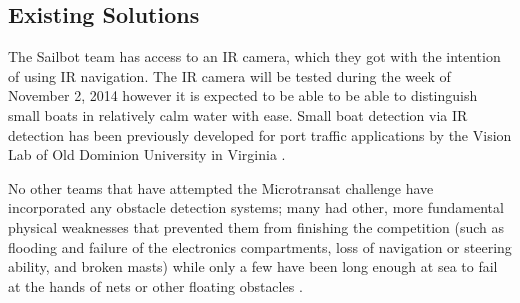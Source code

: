 \subsection{\label{sec:intro:existing-solutions}Existing Solutions}
The Sailbot team has access to an IR camera, which they got with the intention of using IR navigation. The IR camera will be tested during the week of November 2, 2014 however it is expected to be able to be able to distinguish small boats in relatively calm water with ease. Small boat detection via IR detection has been previously developed for port traffic applications by the Vision Lab of Old Dominion University in Virginia \cite{ODU-boat-IR-detection}.

No other teams that have attempted the Microtransat challenge have incorporated any obstacle detection systems; many had other, more fundamental physical weaknesses that prevented them from finishing the competition (such as flooding and failure of the electronics compartments, loss of navigation or steering ability, and broken masts) while only a few have been long enough at sea to fail at the hands of nets or other floating obstacles \cite{transat-history}.


